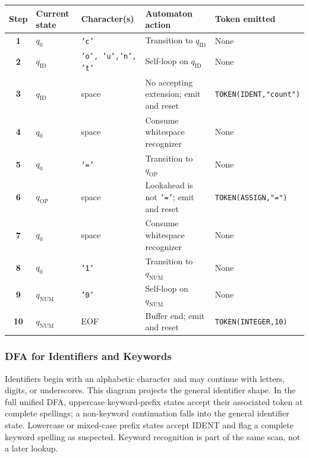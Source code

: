 \documentclass[11pt,a4paper]{article}
\newcommand{\token}[1]{\texttt{#1}}
\newcommand{\codeinline}[1]{\texttt{#1}}
\begin{document}
\begin{table}[H]
\centering\small
\begin{tabularx}{\linewidth}{>{\bfseries}c L{17mm} L{28mm} Y Y}
\toprule
Step & Current state & Character(s) & Automaton action & Token emitted \\
 & $q_0$ & \codeinline{'c'} & Transition to $q_{\mathrm{ID}}$ & None \\
2 & $q_{\mathrm{ID}}$ & \codeinline{'o', 'u',}\newline\codeinline{'n', 't'} & Self-loop on $q_{\mathrm{ID}}$ & None \\
3 & $q_{\mathrm{ID}}$ & space & No accepting extension; emit and reset & \token{TOKEN(IDENT,}\newline\token{"count")} \\
4 & $q_0$ & space & Consume whitespace recognizer & None \\
5 & $q_0$ & \codeinline{'='} & Transition to $q_{\mathrm{OP}}$ & None \\
6 & $q_{\mathrm{OP}}$ & space & Lookahead is not \codeinline{'='}; emit and reset & \token{TOKEN(ASSIGN,}\newline\token{"=")} \\
7 & $q_0$ & space & Consume whitespace recognizer & None \\
8 & $q_0$ & \codeinline{'1'} & Transition to $q_{\mathrm{NUM}}$ & None \\
9 & $q_{\mathrm{NUM}}$ & \codeinline{'0'} & Self-loop on $q_{\mathrm{NUM}}$ & None \\
10 & $q_{\mathrm{NUM}}$ & EOF & Buffer end; emit and reset & \token{TOKEN(INTEGER,}\newline\token{10)} \\
\bottomrule
\end{tabularx}
\end{table}

\subsubsection{DFA for Identifiers and Keywords}

Identifiers begin with an alphabetic character and may continue with letters, digits, or underscores. This diagram projects the general identifier shape. In the full unified DFA, uppercase keyword-prefix states accept their associated token at complete spellings; a non-keyword continuation falls into the general identifier state. Lowercase or mixed-case prefix states accept IDENT and flag a complete keyword spelling as suspected. Keyword recognition is part of the same scan, not a later lookup.
\end{document}

